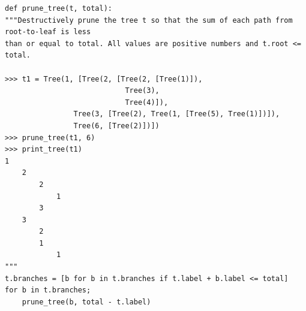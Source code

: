 \documentclass{exam}
\begin{document}
\begin{questions}
\begin{solution}
\begin{lstlisting}
def prune_tree(t, total):
"""Destructively prune the tree t so that the sum of each path from root-to-leaf is less
than or equal to total. All values are positive numbers and t.root <= total.

>>> t1 = Tree(1, [Tree(2, [Tree(2, [Tree(1)]),
                            Tree(3),
                            Tree(4)]),
                Tree(3, [Tree(2), Tree(1, [Tree(5), Tree(1)])]),
                Tree(6, [Tree(2)])])
>>> prune_tree(t1, 6)
>>> print_tree(t1)
1
    2
        2
            1
        3
    3
        2
        1
            1
"""
t.branches = [b for b in t.branches if t.label + b.label <= total]
for b in t.branches;
    prune_tree(b, total - t.label)
\end{lstlisting}
\end{solution}
\end{questions}
\end{document}
